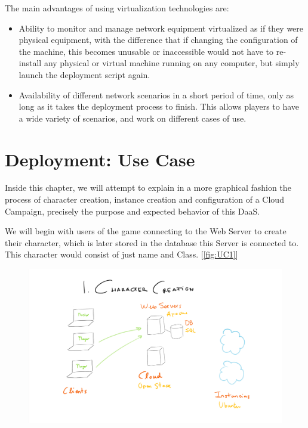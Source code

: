 \documentclass[a4paper,12pt]{report}
\begin{document}
The main advantages of using virtualization technologies are:
\begin{itemize}
\item Ability to monitor and manage network equipment virtualized as if they were physical equipment, with the difference that if changing the configuration of the machine, this becomes unusable or inaccessible would not have to re-install any physical or virtual machine running on any computer, but simply launch the deployment script again.
\item Availability of different network scenarios in a short period of time, only as long as it takes the deployment process to finish. This allows players to have a wide variety of scenarios, and work on different cases of use.
\end{itemize}

\chapter{Deployment: Use Case}
\label{ch:dev}

Inside this chapter, we will attempt to explain in a more graphical fashion the process of character creation, instance creation and configuration of a Cloud Campaign, precisely the purpose and expected behavior of this DaaS.


We will begin with users of the game connecting to the Web Server to create their character, which is later stored in the database this Server is connected to. This character would consist of just name and Class. [\autoref{fig:UC1}]

\begin{figure}[h!]
\caption{}
\centering
\includegraphics[width=1\textwidth]{images/Phase1.png}
\label{fig:UC1}
\end{figure}
\end{document}

